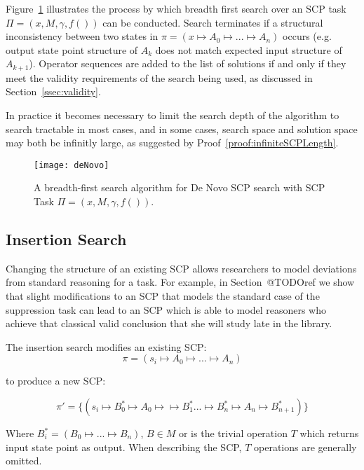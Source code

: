 Figure~\ref{fig:deNovo} illustrates the process by which breadth first search over an SCP task $\Pi=(x,M,\gamma,f())$ can be conducted. Search terminates if a structural inconsistency between two states in $\pi=(x\longmapsto A_0 \longmapsto ... \longmapsto A_n)$ occurs (e.g. output state point structure of $A_k$ does not match expected input structure of $A_{k+1}$). Operator sequences are added to the list of solutions if and only if they meet the validity requirements of the search being used, as discussed in Section~\ref{ssec:validity}. 

In practice it becomes necessary to limit the search depth of the algorithm to search tractable in most cases, and in some cases, search space and solution space may both be infinitly large, as suggested by Proof~\ref{proof:infiniteSCPLength}.

\begin{figure}
\begin{center}
\texttt{[image: deNovo]}
\end{center}
\caption{A breadth-first search algorithm for De Novo SCP search with SCP Task $\Pi=(x,M,\gamma,f())$.}
\label{fig:deNovo}
\end{figure}

\subsection{Insertion Search}\label{ssec:insertion}

Changing the structure of an existing SCP allows researchers to model deviations from standard reasoning for a task. For example, in Section~@TODOref we show that slight modifications to an SCP that models the standard case of the suppression task can lead to an SCP which is able to model reasoners who achieve that classical valid conclusion that she will study late in the library.

The insertion search modifies an existing SCP:
\[\pi=(s_i \longmapsto A_0 \longmapsto ... \longmapsto A_n)\]

to produce a new SCP:

\[
\pi'=\{(s_i \longmapsto B^*_0 \longmapsto A_0 \longmapsto \longmapsto B^*_1... \longmapsto  B^*_n \longmapsto A_n \longmapsto  B^*_{n+1})\}
\] 

Where $B^*_i = (B_0\longmapsto ...\longmapsto B_n)$, $B \in M$  or is the trivial operation $T$ which returns input state point as output. When describing the SCP, $T$ operations are generally omitted.

